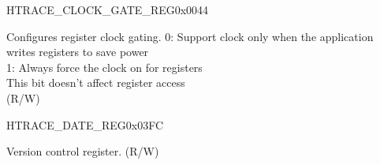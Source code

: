 \begin{register}{H}{TRACE\_CLOCK\_GATE\_REG}{0x0044}\label{regdesc:TRACECLOCKGATEREG}
%
%
\regnewline%
\begin{regdesc}\begin{reglist}
\label{fielddesc:TRACECLKEN}\item [TRACE\_CLK\_EN] Configures register clock gating.
0: Support clock only when the application writes registers to save power\\
1: Always force the clock on for registers\\
 This bit doesn't affect register access\\ (R/W)
\end{reglist}\end{regdesc}
\end{register}


\begin{register}{H}{TRACE\_DATE\_REG}{0x03FC}\label{regdesc:TRACEDATEREG}
%
%
\regnewline%
\begin{regdesc}\begin{reglist}
\label{fielddesc:TRACEDATE}\item [TRACE\_DATE] Version control register. (R/W)
\end{reglist}\end{regdesc}
\end{register}


